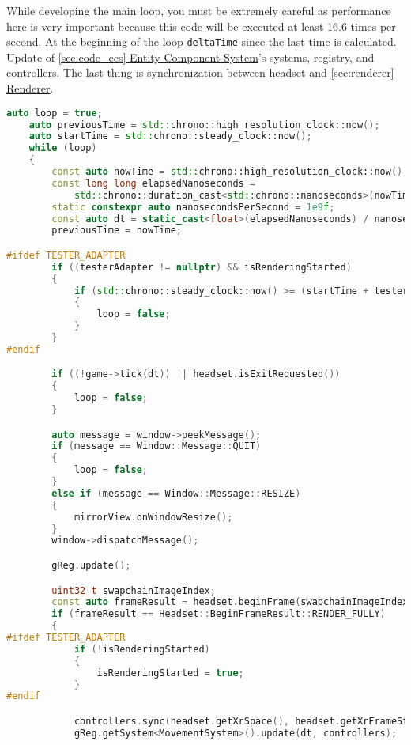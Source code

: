\label{main_loop}
While developing the main loop, you must be extremely careful as performance here is very important because this code will be executed at least 16.6 times per second. At the beginning of the loop \texttt{deltaTime} since the last time is calculated. Update of \hyperref[sec:code_ecs]{\ref*{sec:code_ecs} Entity Component System}'s systems, registry, and controllers. The last thing is synchronization between headset and \hyperref[sec:renderer]{\ref*{sec:renderer} Renderer}.
\begin{lstlisting}[language=c++, caption=Engine main loop (./engine/src/core/core.cpp)]
    auto loop = true;
    auto previousTime = std::chrono::high_resolution_clock::now();
    auto startTime = std::chrono::steady_clock::now();
    while (loop)
    {
        const auto nowTime = std::chrono::high_resolution_clock::now();
        const long long elapsedNanoseconds =
            std::chrono::duration_cast<std::chrono::nanoseconds>(nowTime - previousTime).count();
        static constexpr auto nanosecondsPerSecond = 1e9f;
        const auto dt = static_cast<float>(elapsedNanoseconds) / nanosecondsPerSecond;
        previousTime = nowTime;

#ifdef TESTER_ADAPTER 
        if ((testerAdapter != nullptr) && isRenderingStarted)
        {
            if (std::chrono::steady_clock::now() >= (startTime + testerAdapter->renderingDuration))
            {
                loop = false;
            }
        }
#endif

        if ((!game->tick(dt)) || headset.isExitRequested())
        {
            loop = false;
        }

        auto message = window->peekMessage();
        if (message == Window::Message::QUIT)
        {
            loop = false;
        }
        else if (message == Window::Message::RESIZE)
        {
            mirrorView.onWindowResize();
        }
        window->dispatchMessage();

        gReg.update();

        uint32_t swapchainImageIndex;
        const auto frameResult = headset.beginFrame(swapchainImageIndex);
        if (frameResult == Headset::BeginFrameResult::RENDER_FULLY)
        {
#ifdef TESTER_ADAPTER
            if (!isRenderingStarted)
            {
                isRenderingStarted = true;
            }
#endif

            controllers.sync(headset.getXrSpace(), headset.getXrFrameState().predictedDisplayTime);
            gReg.getSystem<MovementSystem>().update(dt, controllers);


\end{lstlisting}
